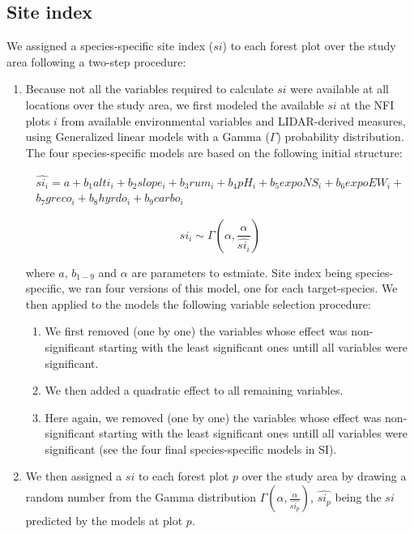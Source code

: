 \documentclass[a4paper]{article}
\begin{document}

\subsection*{Site index}

\noindent We assigned a species-specific site index ($si$) to each forest plot over the study area following a two-step procedure:

\begin{enumerate}
    \item Because not all the variables required to calculate $si$ were available at all locations over the study area, we first modeled the available $si$ at the NFI plots $i$ from available environmental variables and LIDAR-derived measures, using Generalized linear models with a Gamma ($\Gamma$) probability distribution. The four species-specific models are based on the following initial structure:

    \begin{multline}\label{si}
      \widehat{si_i} = a + b_1 alti_i + b_2 slope_i + b_3 rum_i + b_4 pH_i + b_5 expoNS_i + b_6 expoEW_i + \\ b_7 greco_i + b_8 hyrdo_i + b_9 carbo_i
    \end{multline}

    \begin{equation}\label{si}
      si_i \sim \Gamma(\alpha, \frac{\alpha}{\widehat{si_i}})
    \end{equation}

    where $a$, $b_{1-9}$ and $\alpha$ are parameters to estmiate. Site index being species-specific, we ran four versions of this model, one for each target-species. We then applied to the models the following variable selection procedure:

    \begin{enumerate}

        \item We first removed (one by one) the variables whose effect was non-significant starting with the least significant ones untill all variables were significant.

        \item We then added a quadratic effect to all remaining variables.

        \item Here again, we removed (one by one) the variables whose effect was non-significant starting with the least significant ones untill all variables were significant (see the four final species-specific models in SI).

  \end{enumerate}

    \item We then assigned a $si$ to each forest plot $p$ over the study area by drawing a random number from the Gamma distribution $\Gamma(\alpha, \frac{\alpha}{\widehat{si_p}})$, $\widehat{si_p}$ being the $si$ predicted by the models at plot $p$.

\end{enumerate}
\end{document}
